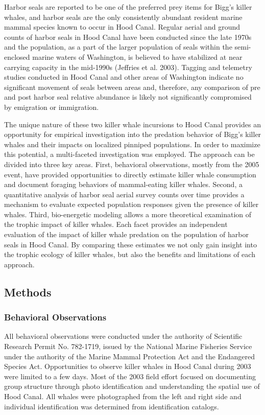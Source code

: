 Harbor seals are reported to be one of the preferred prey items for
Bigg's killer whales, and harbor seals are the only consistently
abundant resident marine mammal species known to occur in Hood Canal.
Regular aerial and ground counts of harbor seals in Hood Canal have been
conducted since the late 1970s and the population, as a part of the
larger population of seals within the semi-enclosed marine waters of
Washington, is believed to have stabilized at near carrying capacity in
the mid-1990s (Jeffries et al. 2003). Tagging and telemetry studies
conducted in Hood Canal and other areas of Washington indicate no
significant movement of seals between areas and, therefore, any
comparison of pre and post harbor seal relative abundance is likely not
significantly compromised by emigration or immigration.

The unique nature of these two killer whale incursions to Hood Canal
provides an opportunity for empirical investigation into the predation
behavior of Bigg's killer whales and their impacts on localized pinniped
populations. In order to maximize this potential, a multi-faceted
investigation was employed. The approach can be divided into three key
areas. First, behavioral observations, mostly from the 2005 event, have
provided opportunities to directly estimate killer whale consumption and
document foraging behaviors of mammal-eating killer whales. Second, a
quantitative analysis of harbor seal aerial survey counts over time
provides a mechanism to evaluate expected population responses given the
presence of killer whales. Third, bio-energetic modeling allows a more
theoretical examination of the trophic impact of killer whales. Each
facet provides an independent evaluation of the impact of killer whale
predation on the population of harbor seals in Hood Canal. By comparing
these estimates we not only gain insight into the trophic ecology of
killer whales, but also the benefits and limitations of each approach.

\subsection{Methods}\label{methods}

\subsubsection{Behavioral Observations}\label{behavioral-observations}

All behavioral observations were conducted under the authority of
Scientific Research Permit No. 782-1719, issued by the National Marine
Fisheries Service under the authority of the Marine Mammal Protection
Act and the Endangered Species Act. Opportunities to observe killer
whales in Hood Canal during 2003 were limited to a few days. Most of the
2003 field effort focused on documenting group structure through photo
identification and understanding the spatial use of Hood Canal. All
whales were photographed from the left and right side and individual
identification was determined from identification catalogs.

